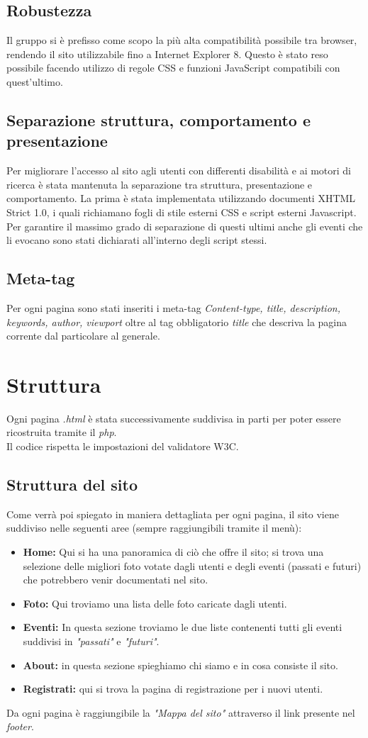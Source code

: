 	\subsection{Robustezza}
	Il gruppo si è prefisso come scopo la più alta compatibilità possibile tra browser, rendendo il sito utilizzabile fino a Internet Explorer 8. Questo è stato reso possibile facendo utilizzo di regole CSS e funzioni JavaScript compatibili con quest'ultimo.
	\subsection{Separazione struttura, comportamento e presentazione}
	Per migliorare l’accesso al sito agli utenti con differenti disabilità e ai motori di
ricerca è stata mantenuta la separazione tra struttura, presentazione e comportamento.
La prima è stata implementata utilizzando documenti XHTML Strict 1.0, i quali richiamano fogli di stile esterni CSS e script esterni Javascript. Per garantire il massimo grado di separazione di questi ultimi anche gli eventi che li evocano sono stati dichiarati all'interno degli script stessi.
	\subsection{Meta-tag}
	Per ogni pagina sono stati inseriti i meta-tag \textit{Content-type, title, description, keywords, author, viewport} oltre al tag obbligatorio \textit{title} che descriva la pagina corrente dal particolare al generale.
	\section{Struttura}
	Ogni pagina \textit{.html} è stata successivamente suddivisa in parti per poter essere ricostruita tramite il \textit{php}.\\ Il codice rispetta le impostazioni del validatore W3C.
	\subsection{Struttura del sito}
	Come verrà poi spiegato in maniera dettagliata per ogni pagina, il sito viene suddiviso nelle seguenti aree (sempre raggiungibili tramite il menù):
	\begin{itemize}
	\item \textbf{Home:} Qui si ha una panoramica di ciò che offre il sito; si trova una selezione delle migliori foto votate dagli utenti e degli eventi (passati e futuri) che potrebbero venir documentati nel sito.
	\item \textbf{Foto:} Qui troviamo una lista delle foto caricate dagli utenti.
	\item \textbf{Eventi:} In questa sezione troviamo le due liste contenenti tutti gli eventi suddivisi in \textit{"passati"} e \textit{"futuri"}.
	\item \textbf{About:} in questa sezione spieghiamo chi siamo e in cosa consiste il sito.
	\item \textbf{Registrati:} qui si trova la pagina di registrazione per i nuovi utenti.
	\end{itemize}
	Da ogni pagina è raggiungibile la \textit{"Mappa del sito"} attraverso il link presente nel \textit{footer}.
